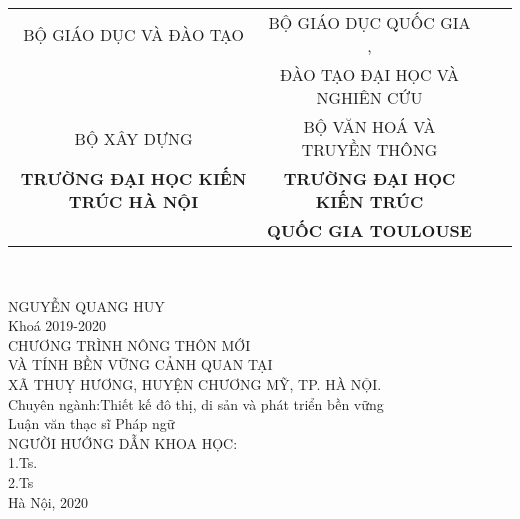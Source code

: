 \documentclass[../thesis.tex]{subfiles}
\begin{document}
\begin{titlepage}

\begin{center}
\begin{table}
\small
\centering
\begin{tabular}{c c r l}
BỘ GIÁO DỤC VÀ ĐÀO TẠO  &  BỘ GIÁO DỤC QUỐC GIA ,\\
 & ĐÀO TẠO ĐẠI HỌC VÀ NGHIÊN CỨU\\ 
BỘ XÂY DỰNG & BỘ VĂN HOÁ VÀ TRUYỀN THÔNG\\
\textbf{TRƯỜNG ĐẠI HỌC KIẾN TRÚC HÀ NỘI} & \textbf{TRƯỜNG ĐẠI HỌC KIẾN TRÚC}\\
& \textbf{QUỐC GIA TOULOUSE}
\end{tabular}
\\[1cm]
\end{table}

\normalsize NGUYỄN QUANG HUY\\[1cm]
Khoá 2019-2020\\[1cm]


\large CHƯƠNG TRÌNH NÔNG THÔN MỚI\\ VÀ TÍNH BỀN VỮNG CẢNH QUAN TẠI\\ XÃ THUỴ HƯƠNG, HUYỆN CHƯƠNG MỸ, TP. HÀ NỘI.\\[2cm]

\normalsize Chuyên ngành:Thiết kế đô thị, di sản và phát triển bền vững\\
Luận văn thạc sĩ Pháp ngữ\\[2cm]

NGƯỜI HƯỚNG DẪN KHOA HỌC:\\[1cm]
1.Ts.\\
2.Ts\\[1cm]


Hà Nội, 2020

\end{center}

\end{titlepage}
\end{document}
